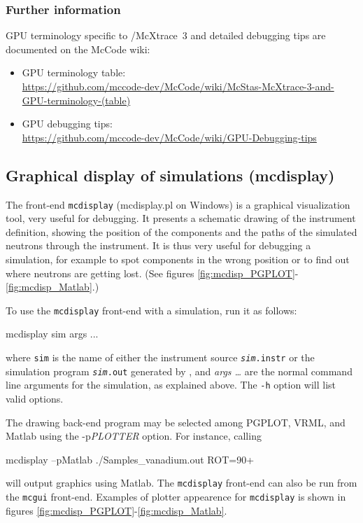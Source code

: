 \subsubsection{Further information}

GPU terminology specific to \McStas/McXtrace~3 and detailed debugging
tips are documented on the McCode wiki:
\begin{itemize}
  \item GPU terminology table:\\
    \url{https://github.com/mccode-dev/McCode/wiki/McStas-McXtrace-3-and-GPU-terminology-(table)}
  \item GPU debugging tips:\\
    \url{https://github.com/mccode-dev/McCode/wiki/GPU-Debugging-tips}
\end{itemize}



\subsection{Graphical display of simulations (mcdisplay)}
\label{s:mcdisplay}

The front-end \verb+mcdisplay+ (mcdisplay.pl on Windows) is a graphical
visualization tool, very useful for debugging.  It presents a schematic drawing
of the instrument definition, showing the position of the components and the
paths of the simulated neutrons through the instrument. It is thus very useful
for debugging a simulation, for example to spot components in the wrong position
or to find out where neutrons are getting lost.  (See figures
\ref{fig:mcdisp_PGPLOT}-\ref{fig:mcdisp_Matlab}.)

To use the \verb+mcdisplay+ front-end with a simulation, run it as
follows:
\begin{bash}
mcdisplay sim args ...
\end{bash}

where \verb+sim+ is the name of either the instrument source
\texttt{\textit{sim}.instr} or the simulation program \texttt{\textit{sim}.out} generated by \mcs,
and \textit{args \ldots} are the normal command line arguments for the
simulation, as explained above. The \verb+-h+ option will list valid options.

The drawing back-end program may be selected among
PGPLOT, VRML, and Matlab using the -p\textit{PLOTTER} option. For instance, calling
\begin{bash}
mcdisplay --pMatlab ./Samples_vanadium.out ROT=90+
\end{bash}
will output graphics using Matlab.
The \verb+mcdisplay+ front-end can also be run from the \verb+mcgui+ front-end.
Examples of plotter appearence for \verb+mcdisplay+ is shown in figures
 \ref{fig:mcdisp_PGPLOT}-\ref{fig:mcdisp_Matlab}.

